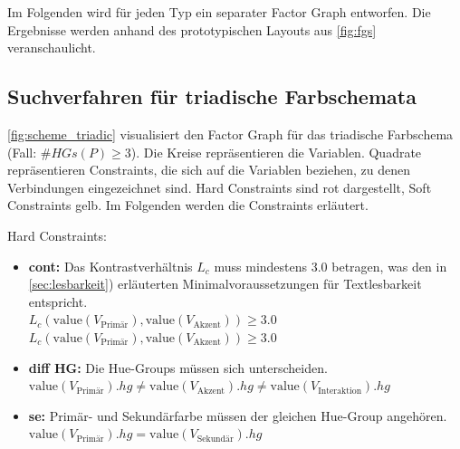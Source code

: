 Im Folgenden wird für jeden Typ ein separater Factor Graph entworfen. Die Ergebnisse werden anhand des prototypischen Layouts aus \autoref{fig:fgs} veranschaulicht.

\subsection{Suchverfahren für triadische Farbschemata}

\autoref{fig:scheme_triadic} visualisiert den Factor Graph für das triadische Farbschema (Fall: $\#HGs(P) \geq 3$). Die Kreise repräsentieren die Variablen. Quadrate repräsentieren Constraints, die sich auf die Variablen beziehen, zu denen Verbindungen eingezeichnet sind. Hard Constraints sind rot dargestellt, Soft Constraints gelb. Im Folgenden werden die Constraints erläutert.

Hard Constraints:
\begin{itemize}
	\item \textbf{cont:} Das Kontrastverhältnis $L_c$ muss mindestens 3.0 betragen, was den in \autoref{sec:lesbarkeit}) erläuterten Minimalvoraussetzungen für Textlesbarkeit  entspricht.\\
		$L_c(\text{value}(V_\text{Primär}), \text{value}(V_\text{Akzent})) \geq 3.0$\\
		$L_c(\text{value}(V_\text{Primär}), \text{value}(V_\text{Akzent})) \geq 3.0$
	\item \textbf{diff HG:} Die Hue-Groups müssen sich unterscheiden. \\ $\text{value}(V_\text{Primär}).hg \neq \text{value}(V_\text{Akzent}).hg \neq \text{value}(V_\text{Interaktion}).hg$
	\item \textbf{se:} Primär- und Sekundärfarbe müssen der gleichen Hue-Group angehören.\\
		$\text{value}(V_\text{Primär}).hg = \text{value}(V_\text{Sekundär}).hg$
\end{itemize}

